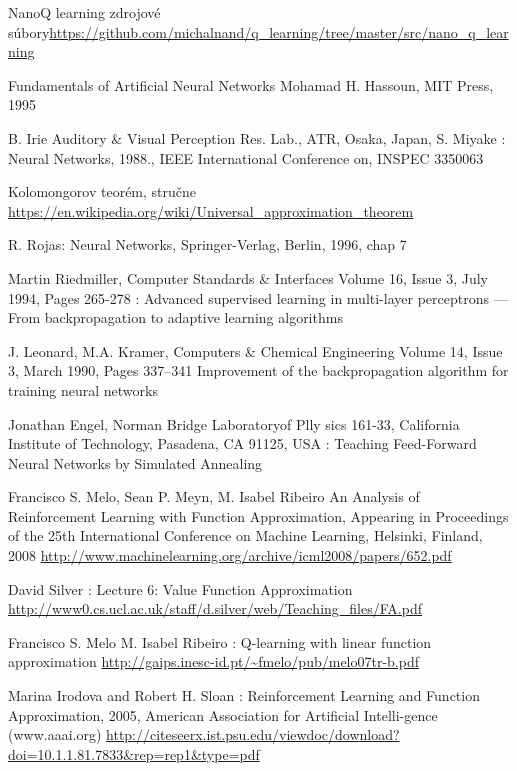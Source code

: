 \begin{thebibliography}{99}
NanoQ learning zdrojové súbory\url{https://github.com/michalnand/q_learning/tree/master/src/nano_q_learning}

Fundamentals of Artificial Neural Networks Mohamad H. Hassoun, MIT Press, 1995

B. Irie Auditory \& Visual Perception Res. Lab., ATR, Osaka, Japan, S. Miyake :
Neural Networks, 1988., IEEE International Conference on, INSPEC 3350063

Kolomongorov teorém, stručne
\url{https://en.wikipedia.org/wiki/Universal_approximation_theorem}

R. Rojas: Neural Networks, Springer-Verlag, Berlin, 1996, chap 7

Martin Riedmiller,  Computer Standards \& Interfaces Volume 16, Issue 3, July 1994, Pages 265-278 :
Advanced supervised learning in multi-layer perceptrons — From backpropagation to adaptive learning algorithms

J. Leonard, M.A. Kramer, Computers \& Chemical Engineering Volume 14, Issue 3, March 1990, Pages 337–341
Improvement of the backpropagation algorithm for training neural networks

 Jonathan Engel,
Norman Bridge Laboratoryof Plly sics 161-33, California Institute of Technology,
Pasadena, CA 91125, USA : Teaching Feed-Forward Neural Networks by Simulated Annealing



 Francisco S. Melo, Sean P. Meyn, M. Isabel Ribeiro
An Analysis of Reinforcement Learning with Function Approximation,
Appearing in Proceedings of the 25th International Conference on Machine Learning, Helsinki, Finland, 2008
\url{http://www.machinelearning.org/archive/icml2008/papers/652.pdf}

 David Silver : Lecture 6: Value Function Approximation
\url{http://www0.cs.ucl.ac.uk/staff/d.silver/web/Teaching_files/FA.pdf}

 Francisco S. Melo M. Isabel Ribeiro : Q-learning with linear function approximation
\url{http://gaips.inesc-id.pt/~fmelo/pub/melo07tr-b.pdf}

 Marina Irodova and Robert H. Sloan : Reinforcement Learning and Function Approximation,
2005,  American  Association  for  Artificial  Intelli-gence (www.aaai.org)
\url{http://citeseerx.ist.psu.edu/viewdoc/download?doi=10.1.1.81.7833&rep=rep1&type=pdf}




\end{thebibliography}
